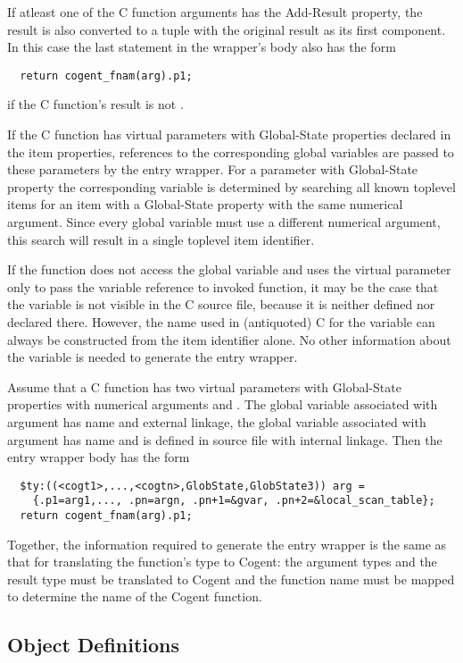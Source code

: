 If atleast one of the C function arguments has the Add-Result property, the result is also converted to a tuple 
with the original result as its first component. In this case the last statement in the wrapper's body also
has the form
\begin{verbatim}
  return cogent_fnam(arg).p1;
\end{verbatim}
if the C function's result is not .

If the C function has virtual parameters with Global-State properties declared in the item properties, references
to the corresponding global variables are passed to these parameters by the entry wrapper. For a parameter with 
Global-State property the corresponding variable is determined by searching all known toplevel items for an
item with a Global-State property with the same numerical argument. Since every global variable must use a 
different numerical argument, this search will result in a single toplevel item identifier. 

If the function does not access the global variable and uses the virtual parameter only to pass the variable 
reference to invoked function, it may be the case that the variable is not visible in the C source file, because
it is neither defined nor declared there. However, the name used in (antiquoted) C for the variable can always 
be constructed from the item identifier alone. No other information about the variable is needed to generate the 
entry wrapper.

Assume that a C function has two virtual parameters with Global-State properties with numerical arguments 
 and . The global variable associated with argument  has name  and external linkage,
the global variable associated with argument  has name  and is defined in source file 
with internal linkage. Then the entry wrapper body has the form
\begin{verbatim}
  $ty:((<cogt1>,...,<cogtn>,GlobState,GlobState3)) arg = 
    {.p1=arg1,..., .pn=argn, .pn+1=&gvar, .pn+2=&local_scan_table};
  return cogent_fnam(arg).p1;
\end{verbatim}

Together, the information required to generate the entry wrapper is the same as that for translating the
function's type to Cogent: the argument types and the result type must be translated to Cogent and the
function name must be mapped to determine the name of the Cogent function.

\subsection{Object Definitions}
\label{design-fundefs-object}

